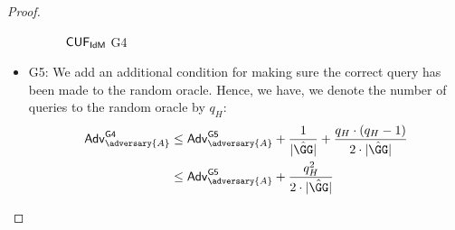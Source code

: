 \begin{proof}
\begin{itemize}
\begin{figure*}
{{\begin{pchstack}[center, space=0.2cm, boxed]
\begin{pcvstack}
    \end{pcvstack}
    \end{pchstack}
}}
\caption{$\mathsf{CUF}_{\textsf{IdM}}$ \textsf{G4}}
\label{game:cuf_idmg3}
\end{figure*}

\item \textsf{G5}: We add an additional condition for making sure the correct query has been made to the random oracle. Hence, we have, we denote the number of queries to the random oracle by $q_H$:
        \begin{align*}
            \advtg_\adversary{A}^{\mathsf{G4}} &\le \advtg_\adversary{A}^{\mathsf{G5}}  + \frac{1}{|\GGhat|} + \frac{q_H\cdot(q_H-1)}{2\cdot |\GGhat|}\\
            &\le \advtg_\adversary{A}^{\mathsf{G5}} + \frac{q_H^2}{2\cdot |\GGhat|}
        \end{align*}




\end{itemize}
\end{proof}
